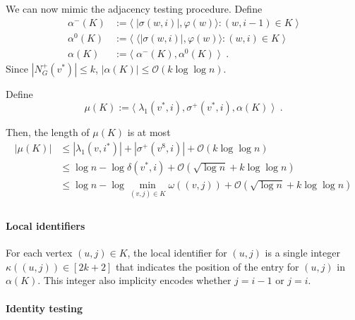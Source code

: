 \documentclass{patmorin}
\renewcommand{\le}{\leqslant}
\newcommand{\Oh}{\mathcal{O}}
\begin{document}
  We can now mimic the adjacency testing procedure.  Define
  \begin{align*}
    \alpha^-(K) & := \langle\; |\sigma(w,i)|, \varphi(w)\rangle : (w,i-1)\in K \;\rangle \\
    \alpha^0(K) & := \langle\; \langle |\sigma(w,i)|, \varphi(w)\rangle : (w,i)\in K \;\rangle \\
    \alpha(K)
    & := \langle\; \alpha^-(K),\alpha^0(K)  \;\rangle \enspace .
  \end{align*}
  Since $|N^+_G(v^*)|\le k$, $|\alpha(K)|\le\Oh(k\log\log n)$.


  Define
  \[
     \mu(K) := \langle\; \lambda_1(v^*,i), \sigma^+(v^*,i), \alpha(K) \;\rangle \enspace .
  \]

  Then, the length of $\mu(K)$ is at most
  \begin{align*}
    |\mu(K)|
    & \le |\lambda_1(v,i^*)| + |\sigma^+(v^8,i)| + \Oh(k \log\log n) \\
    & \le \log n - \log\delta(v^*,i) + \Oh(\sqrt{\log n} + k\log\log n) \\
    & \le \log n - \log\min_{(v,j)\in K}\omega((v,j)) + \Oh(\sqrt{\log n} + k\log\log n) \\
  \end{align*}

  \paragraph{Local identifiers}

  For each vertex $(u,j)\in K$, the local identifier for $(u,j)$ is a single integer $\kappa((u,j))\in[2k+2]$ that indicates the position of the entry for $(u,j)$ in $\alpha(K)$.  This integer also implicity encodes whether $j=i-1$  or $j=i$.


  \paragraph{Identity testing}
\end{document}

